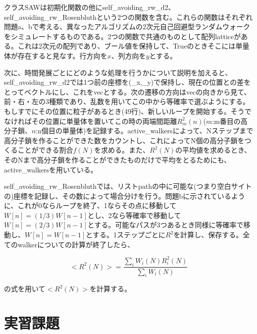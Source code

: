 \documentclass{jsarticle}
\begin{document}
            クラスSAWは初期化関数の他にself\_avoiding\_rw\_d2、self\_avoiding\_rw\_Rosenbluthという2つの関数を含む。これらの関数はそれぞれ問題a、bで考える、異なったアルゴリズムの2次元自己回避型ランダムウォークをシミュレートするものである。2つの関数で共通のものとして配列latticeがある。これは2次元の配列であり、ブール値を保持して、Trueのときそこには単量体が存在すると見なす。行方向を$x$、列方向を$y$とする。
            
            次に、時間発展ごとにどのような処理を行うかについて説明を加えると、self\_avoiding\_rw\_d2では1つ前の座標を(\_x,\_y)で保持し、現在の位置との差をとってベクトルにし、これをvecとする。次の遷移の方向はvecの向きから見て、前・右・左の3種類であり、乱数を用いてこの中から等確率で選ぶようにする。もしすでにその位置に粒子があるとき(49行)、新しいループを開始する。そうでなければその位置に単量体を置いてこの時の両端間距離$R^{2}_{m}(n)$($m$:m番目の高分子鎖、$n$:n個目の単量体)を記録する。active\_walkersによって、Nステップまで高分子鎖を作ることができた数をカウントし、これによってN個の高分子鎖をつくることができる割合$f(N)$を求める。また、$R^{2}(N)$の平均値を求めるとき、そのNまで高分子鎖を作ることができたものだけで平均をとるためにも、active\_walkersを用いている。
            
            self\_avoiding\_rw\_Rosenbluthでは、リストpathの中に可能な(つまり空白サイトの)座標を記録し、その数によって場合分けを行う。問題bに示されているように、これが0ならループを終了、1ならその点に移動して$W[n]=(1/3)W[n-1]$とし、2なら等確率で移動して$W[n] = (2/3)W[n-1]$とする。可能なパスが3つあるとき同様に等確率で移動し、$W[n] = W[n-1]$とする。1ステップごとに$R^{2}$を計算し、保存する。全てのwalkerについての計算が終了したら、
            
            \begin{equation}
                <R^{2}(N)> = \frac{\sum_{i}W_{i}(N)R^{2}_{i}(N)}{\sum_{i}W_{i}(N)}
            \end{equation}
            
            の式を用いて$<R^{2}(N)>$を計算する。
        
            
    \section{実習課題}
    
\end{document}
